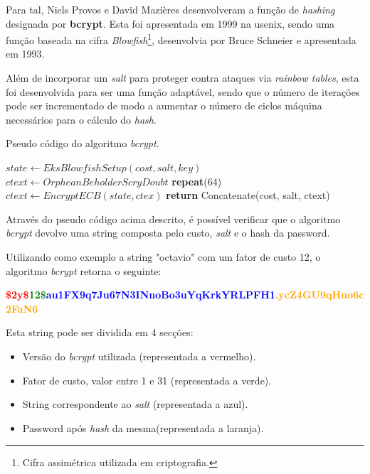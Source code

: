 Para tal, Niels Provos e David Mazières desenvolveram a função de \emph{hashing} designada por \textbf{bcrypt}\cite{provos1999future}. Esta foi apresentada em 1999 na \gls{usenix}, sendo uma função baseada na cifra \emph{Blowfish}\footnote{Cifra assimétrica utilizada em criptografia.}, desenvolvia por Bruce Schneier e apresentada em 1993.

Além de incorporar um \emph{salt} para proteger contra ataques via \emph{rainbow tables}, esta foi desenvolvida para ser uma função adaptável, sendo que o número de iterações pode ser incrementado de modo a aumentar o número de ciclos máquina necessários para o cálculo do \emph{hash}. 

\begin{algorithm}
    \caption{Pseudo código do algoritmo \emph{bcrypt}.}
    \begin{algorithmic}[1]
        \State $state\gets EksBlowfishSetup(cost,salt,key)$
        \State $ctext\gets OrpheanBeholderScryDoubt$
        \State \textbf{repeat}(64)
        \State \indent $ctext\gets EncryptECB(state, ctex)$
        \State \textbf{return} Concatenate(cost, salt, ctext)
    \EndFunction
    \end{algorithmic}
\end{algorithm}

Através do pseudo código acima descrito, é possível verificar que o algoritmo \emph{bcrypt} devolve uma string composta pelo custo, \emph{salt} e o hash da password.

Utilizando como exemplo a string "octavio" com um fator de custo 12, o algoritmo \emph{bcrypt} retorna o seguinte:

\begin{center}
    \textbf{\textcolor{red}{\$2y\$}\textcolor{green}{12\$}\textcolor{blue}{au1FX9q7Ju67N3INnoBo3uYqKrkYRLPFH1}\textcolor{orange}{.ycZ4GU9qHuo6c2FaN6}}
\end{center} 

Esta string pode ser dividida em 4 secções:

\begin{itemize}
    \item Versão do \emph{bcrypt} utilizada (representada a vermelho).
    \item Fator de custo, valor entre 1 e 31 (representada a verde).
    \item String correspondente ao \emph{salt} (representada a azul).
    \item Password após \emph{hash} da mesma(representada a laranja).
\end{itemize}

